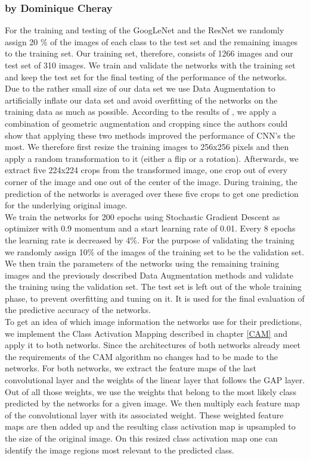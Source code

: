 \documentclass[11pt]{report}
\begin{document}
\subsubsection{by Dominique Cheray}
For the training and testing of the GoogLeNet and the ResNet we randomly
assign 20 \% of the images of each class to the test set and the remaining
images to the training set. Our training set, therefore, consists of 1266 images
and our test set of 310 images. We train and validate the networks with the
training set and keep the test set for the final testing of the performance
of the networks. \\
Due to the rather small size of our data set we use Data Augmentation to
artificially inflate our data set and avoid overfitting of the networks on the
training data as much as possible. According to the results of \cite{taylor2017improving}, we apply
a combination of geometric augmentation and cropping since the authors could
show that applying these two methods improved the performance of CNN's
the most. We therefore first resize the training images to 256x256 pixels and
then apply a random transformation to it (either a flip or a rotation).
Afterwards, we extract five 224x224 crops from the transformed image, one crop
out of every corner of the image and one out of the center of the image. During
training, the prediction of the networks is averaged over these five crops
to get one prediction for the underlying original image. \\
We train the networks for 200 epochs using Stochastic Gradient Descent as
optimizer with 0.9 momentum and a start learning rate of 0.01. Every 8 epochs
the learning rate is decreased by 4\%. For the purpose of validating the
training we randomly assign 10\% of the images of the training set to be the validation
set. We then train the parameters of the networks using the remaining training
images and the previously described Data Augmentation methods and validate the
training using the validation set. The test set is left out of the whole
training phase, to prevent overfitting and tuning on it. It is used for the
final evaluation of the predictive accuracy of the networks. \\
To get an idea of which image information the networks use for their
predictions, we implement the Class Activation Mapping described in chapter
\ref{CAM} and apply it to both networks. Since the architectures of both
networks already 
meet the requirements of the CAM algorithm no changes had to be made to the
networks. For both networks, we extract the feature maps of the last
convolutional layer and the weights of the linear layer that follows the GAP
layer. Out of all those weights, we use the weights that belong to the most
likely class predicted by the networks for a given image. We then multiply each
feature map of the convolutional layer with its associated weight. These
weighted feature maps are then added up and the resulting class activation map
is upsampled to the size of the original image. On this resized class activation
map one can identify the image regions most relevant to the predicted class.  
\end{document}

